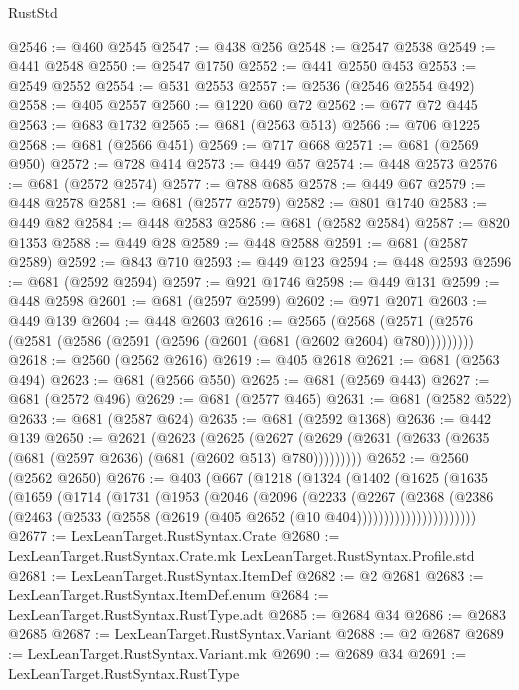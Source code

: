 \begin{lexlean}{RustStd}
\begin{coremodule}
{\begin{coremodule}
{{{{{{{{{{{{{{{{{{{{{{{{{@2546 := @460 @2545
@2547 := @438 @256
@2548 := @2547 @2538
@2549 := @441 @2548
@2550 := @2547 @1750
@2552 := @441 @2550 @453
@2553 := @2549 @2552
@2554 := @531 @2553
@2557 := @2536 (@2546 @2554 @492)
@2558 := @405 @2557
@2560 := @1220 @60 @72
@2562 := @677 @72 @445
@2563 := @683 @1732
@2565 := @681 (@2563 @513)
@2566 := @706 @1225
@2568 := @681 (@2566 @451)
@2569 := @717 @668
@2571 := @681 (@2569 @950)
@2572 := @728 @414
@2573 := @449 @57
@2574 := @448 @2573
@2576 := @681 (@2572 @2574)
@2577 := @788 @685
@2578 := @449 @67
@2579 := @448 @2578
@2581 := @681 (@2577 @2579)
@2582 := @801 @1740
@2583 := @449 @82
@2584 := @448 @2583
@2586 := @681 (@2582 @2584)
@2587 := @820 @1353
@2588 := @449 @28
@2589 := @448 @2588
@2591 := @681 (@2587 @2589)
@2592 := @843 @710
@2593 := @449 @123
@2594 := @448 @2593
@2596 := @681 (@2592 @2594)
@2597 := @921 @1746
@2598 := @449 @131
@2599 := @448 @2598
@2601 := @681 (@2597 @2599)
@2602 := @971 @2071
@2603 := @449 @139
@2604 := @448 @2603
@2616 := @2565
    (@2568 (@2571 (@2576 (@2581 (@2586 (@2591 (@2596 (@2601 (@681 (@2602 @2604) @780)))))))))
@2618 := @2560 (@2562 @2616)
@2619 := @405 @2618
@2621 := @681 (@2563 @494)
@2623 := @681 (@2566 @550)
@2625 := @681 (@2569 @443)
@2627 := @681 (@2572 @496)
@2629 := @681 (@2577 @465)
@2631 := @681 (@2582 @522)
@2633 := @681 (@2587 @624)
@2635 := @681 (@2592 @1368)
@2636 := @442 @139
@2650 := @2621
    (@2623
      (@2625 (@2627 (@2629 (@2631 (@2633 (@2635 (@681 (@2597 @2636) (@681 (@2602 @513) @780)))))))))
@2652 := @2560 (@2562 @2650)
@2676 := @403
    (@667
      (@1218
        (@1324
          (@1402
            (@1625
              (@1635
                (@1659
                  (@1714
                    (@1731
                      (@1953
                        (@2046
                          (@2096
                            (@2233
                              (@2267
                                (@2368
                                  (@2386
                                    (@2463
                                      (@2533
                                        (@2558 (@2619 (@405 @2652 (@10 @404))))))))))))))))))))))
@2677 := LexLeanTarget.RustSyntax.Crate
@2680 := LexLeanTarget.RustSyntax.Crate.mk LexLeanTarget.RustSyntax.Profile.std
@2681 := LexLeanTarget.RustSyntax.ItemDef
@2682 := @2 @2681
@2683 := LexLeanTarget.RustSyntax.ItemDef.enum
@2684 := LexLeanTarget.RustSyntax.RustType.adt
@2685 := @2684 @34
@2686 := @2683 @2685
@2687 := LexLeanTarget.RustSyntax.Variant
@2688 := @2 @2687
@2689 := LexLeanTarget.RustSyntax.Variant.mk
@2690 := @2689 @34
@2691 := LexLeanTarget.RustSyntax.RustType
}}}}}}}}}}}}}}}}}}}}}}}}}
\end{coremodule}}
\end{coremodule}
\end{lexlean}
